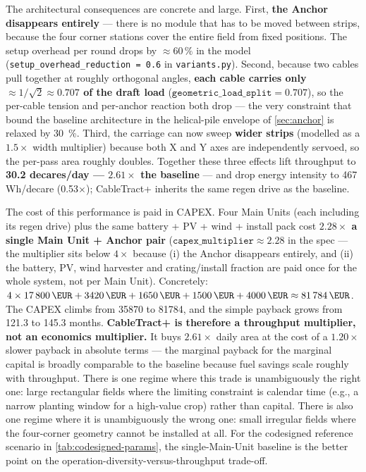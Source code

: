 \documentclass[11pt,a4paper]{article}
\begin{document}
The architectural consequences are concrete and large. First, \textbf{the Anchor disappears entirely} --- there is no module that has to be moved between strips, because the four corner stations cover the entire field from fixed positions. The setup overhead per round drops by ${\approx}60\,\%$ in the model (\texttt{setup\_overhead\_reduction = 0.6} in \texttt{variants.py}). Second, because two cables pull together at roughly orthogonal angles, \textbf{each cable carries only ${\approx}1/\sqrt{2} \approx 0.707$ of the draft load} ($\texttt{geometric\_load\_split} = 0.707$), so the per-cable tension and per-anchor reaction both drop --- the very constraint that bound the baseline architecture in the helical-pile envelope of \cref{sec:anchor} is relaxed by \SI{30}{\percent}. Third, the carriage can now sweep \textbf{wider strips} (modelled as a $1.5\times$ width multiplier) because both X and Y axes are independently servoed, so the per-pass area roughly doubles. Together these three effects lift throughput to \textbf{30.2 decares/day --- $2.61\times$ the baseline} --- and drop energy intensity to 467 Wh/decare (0.53$\times$); CableTract+ inherits the same regen drive as the baseline.

The cost of this performance is paid in CAPEX. Four Main Units (each including its regen drive) plus the same battery + PV + wind + install pack cost \textbf{$2.28\times$ a single Main Unit + Anchor pair} ($\texttt{capex\_multiplier} \approx 2.28$ in the spec --- the multiplier sits below $4\times$ because (i) the Anchor disappears entirely, and (ii) the battery, PV, wind harvester and crating/install fraction are paid once for the whole system, not per Main Unit). Concretely: $4 \times \SI{17800}{\EUR} + \SI{3420}{\EUR} + \SI{1650}{\EUR} + \SI{1500}{\EUR} + \SI{4000}{\EUR} \approx \SI{81784}{\EUR}$. The CAPEX climbs from \SI{35870}{\EUR} to \SI{81784}{\EUR}, and the simple payback grows from 121.3 to 145.3 months. \textbf{CableTract+ is therefore a throughput multiplier, not an economics multiplier.} It buys $2.61\times$ daily area at the cost of a $1.20\times$ slower payback in absolute terms --- the marginal payback for the marginal capital is broadly comparable to the baseline because fuel savings scale roughly with throughput. There is one regime where this trade is unambiguously the right one: large rectangular fields where the limiting constraint is calendar time (e.g., a narrow planting window for a high-value crop) rather than capital. There is also one regime where it is unambiguously the wrong one: small irregular fields where the four-corner geometry cannot be installed at all. For the codesigned reference scenario in \cref{tab:codesigned-params}, the single-Main-Unit baseline is the better point on the operation-diversity-versus-throughput trade-off.
\end{document}
